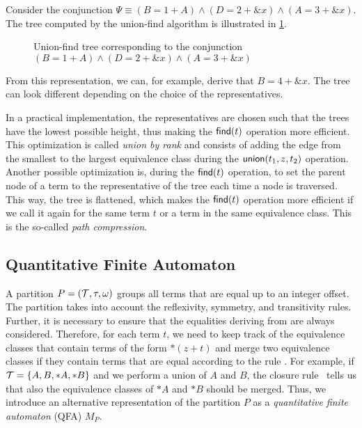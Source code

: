 \begin{example}
  Consider the conjunction $\Psi \equiv (B = 1 + A) \land (D = 2 + \&x) \land (A = 3 + \&x)$.
  The tree computed by the union-find algorithm is illustrated in \cref{fig:uf-tree}.
  \begin{figure}
    \caption{Union-find tree corresponding to the conjunction  $(B = 1 + A) \land (D = 2 + \&x) \land (A = 3 + \&x)$}\label{fig:uf-tree}
  \end{figure}
  From this representation, we can, for example, derive that $B = 4 + \&x$.
  The tree can look different depending on the choice of the representatives.
\end{example}

In a practical implementation, the representatives are chosen such that the trees have the lowest possible height, thus making the $\textsf{find}(t)$ operation more efficient.
This optimization is called \emph{union by rank} and consists of adding the edge from the smallest to the largest equivalence class during the $\textsf{union}(t_1, z, t_2)$ operation.
Another possible optimization is, during the $\textsf{find}(t)$ operation, to set the parent node of a term to the representative of the tree each time a node is traversed.
This way, the tree is flattened, which makes the $\textsf{find}(t)$ operation
more efficient if we call it again for the same term $t$ or a term in the same equivalence class.
This is the so-called \emph{path compression}.~\cite{uf-tarjan}

\subsection{Quantitative Finite Automaton}\label{subsection:qfa}

A partition $P = (\mathcal{T}, \tau, \omega)$ groups all terms that are equal up to an integer offset.
The partition takes into account the reflexivity, symmetry, and transitivity rules.
Further, it is necessary to ensure that the equalities deriving from  are always considered.
Therefore, for each term $t$, we need to keep track of the equivalence classes that contain terms of the form $*(z+t)$ and merge two equivalence classes if they contain terms that are equal according to the rule .
For example, if $\mathcal{T} = \{A, B, *A, *B\}$ and we perform a union of $A$ and $B$, the closure rule~ tells us that also the equivalence classes of $*A$ and $*B$ should be merged.
Thus, we introduce an alternative representation of the partition $P$ as a \emph{quantitative finite automaton} (QFA) $M_P$.

